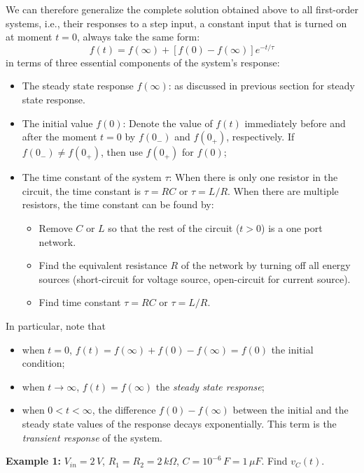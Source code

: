 \documentclass{article}
\begin{document}
We can therefore generalize the complete solution obtained above to all 
first-order systems, i.e., their responses to a step input, a constant input 
that is turned on at moment $t=0$, always take the same form: 
\begin{equation}
  f(t)=f(\infty)+[f(0)-f(\infty)] e^{-t/\tau}	
\end{equation}
in terms of three essential components of the system's response:
\begin{itemize}
\item The steady state response $f(\infty)$: as discussed in previous 
  section for steady state response.
\item The initial value $f(0)$: 
  Denote the value of $f(t)$ immediately before and after the moment
  $t=0$ by $f(0_-)$ and $f(0_+)$, respectively. If $f(0_-)\ne f(0_+)$, 
  then use $f(0_+)$ for $f(0)$;
\item The time constant of the system $\tau$: When there is only one 
  resistor in the circuit, the time constant is $\tau=RC$ or $\tau=L/R$.
  When there are multiple resistors, the time constant can be found by:
  \begin{itemize}
  \item Remove $C$ or $L$ so that the rest of the circuit ($t>0$) is a 
    one port network.
  \item Find the equivalent resistance $R$ of the network by turning off 
    all energy sources (short-circuit for voltage source, open-circuit 
    for current source).
  \item Find time constant $\tau=RC$ or $\tau=L/R$.
  \end{itemize}
\end{itemize}

In particular, note that
\begin{itemize}
  \item when $t=0$, $f(t)=f(\infty)+f(0)-f(\infty)=f(0)$ the initial condition;
  \item when $t\rightarrow \infty$, $f(t)=f(\infty)$ the {\em steady state response};
  \item when $0 < t < \infty$, the difference $f(0)-f(\infty)$ between the initial 
    and the steady state values of the response decays exponentially. This term is 
    the {\em transient response} of the system.
\end{itemize}


{\bf Example 1:} $V_{in}=2\,V$, $R_1=R_2=2\,k\Omega$, $C=10^{-6}\,F=1\,\mu F$.
Find $v_C(t)$.
\end{document}
